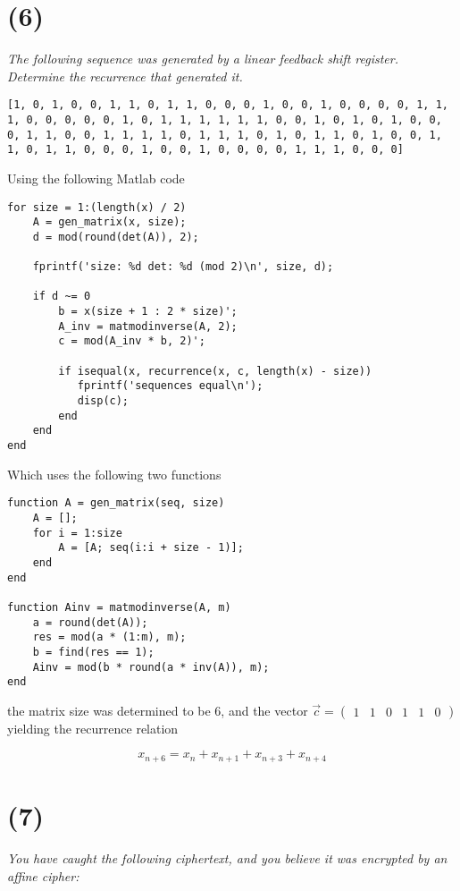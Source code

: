 \documentclass[12pt]{article}
\begin{document}
\section*{(6)} \textit{The following sequence was generated by a linear feedback shift register. Determine the recurrence that generated it.}

\texttt{[1, 0, 1, 0, 0, 1, 1, 0, 1, 1, 0, 0, 0, 1, 0, 0, 1, 0, 0, 0, 0, 1, 1,
1, 0, 0, 0, 0, 0, 1, 0, 1, 1, 1, 1, 1, 1, 0, 0, 1, 0, 1, 0, 1, 0, 0,
0, 1, 1, 0, 0, 1, 1, 1, 1, 0, 1, 1, 1, 0, 1, 0, 1, 1, 0, 1, 0, 0, 1,
1, 0, 1, 1, 0, 0, 0, 1, 0, 0, 1, 0, 0, 0, 0, 1, 1, 1, 0, 0, 0]}

Using the following Matlab code

\begin{verbatim}
for size = 1:(length(x) / 2)
    A = gen_matrix(x, size);
    d = mod(round(det(A)), 2);

    fprintf('size: %d det: %d (mod 2)\n', size, d);

    if d ~= 0
        b = x(size + 1 : 2 * size)';
        A_inv = matmodinverse(A, 2);
        c = mod(A_inv * b, 2)';

        if isequal(x, recurrence(x, c, length(x) - size))
           fprintf('sequences equal\n');
           disp(c);
        end
    end
end
\end{verbatim}

Which uses the following two functions

\begin{verbatim}
function A = gen_matrix(seq, size)
    A = [];
    for i = 1:size
        A = [A; seq(i:i + size - 1)];
    end
end

function Ainv = matmodinverse(A, m)
    a = round(det(A));
    res = mod(a * (1:m), m);
    b = find(res == 1);
    Ainv = mod(b * round(a * inv(A)), m);
end
\end{verbatim}

the matrix size was determined to be $6$, and the vector $\vec{c} = \begin{pmatrix}1 & 1 & 0 & 1 & 1 & 0\end{pmatrix}$ yielding the recurrence relation

$$ x_{n + 6} = x_n + x_{n + 1} + x_{n + 3} + x_{n + 4}$$

\section*{(7)} \textit{You have caught the following ciphertext, and you believe it was encrypted by an affine cipher:}
\end{document}
